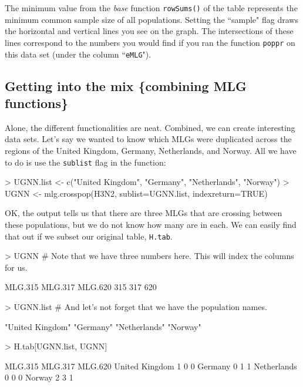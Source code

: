 \documentclass[letterpaper]{article}
\newcommand{\tab}{\hspace*{1em}}
\begin{document}
The minimum value from the \textit{base} function \texttt{rowSums()} of the table represents the minimum common sample size of all populations. Setting the ``sample" flag draws the horizontal and vertical lines you see on the graph. The intersections of these lines correspond to the numbers you would find if you ran the function \texttt{poppr} on this data set (under the column ``\texttt{eMLG}").
\subsection{Getting into the mix \{combining MLG functions\}}\label{mlg:mix}

\tab\tab Alone, the different functionalities are neat. Combined, we can create interesting data sets. Let's say we wanted to know which MLGs were duplicated across the regions of the United Kingdom, Germany, Netherlands, and Norway. All we have to do is use the \texttt{sublist} flag in the function:
\begin{Schunk}
\begin{Sinput}
> UGNN.list <- c("United Kingdom", "Germany", "Netherlands", "Norway")
> UGNN <- mlg.crosspop(H3N2, sublist=UGNN.list, indexreturn=TRUE)
\end{Sinput}
\end{Schunk}
OK, the output tells us that there are three MLGs that are crossing between these
populations, but we do not know how many are in each. We can easily find that out if we subset our original table, \texttt{H.tab}. 

\begin{Schunk}
\begin{Sinput}
> UGNN # Note that we have three numbers here. This will index the columns for us.
\end{Sinput}
\begin{Soutput}
MLG.315 MLG.317 MLG.620 
    315     317     620 
\end{Soutput}
\begin{Sinput}
> UGNN.list # And let's not forget that we have the population names.
\end{Sinput}
\begin{Soutput}
[1] "United Kingdom" "Germany"        "Netherlands"    "Norway"        
\end{Soutput}
\begin{Sinput}
> H.tab[UGNN.list, UGNN]
\end{Sinput}
\begin{Soutput}
               MLG.315 MLG.317 MLG.620
United Kingdom       1       0       0
Germany              0       1       1
Netherlands          0       0       0
Norway               2       3       1
\end{Soutput}
\end{Schunk}
\end{document}
